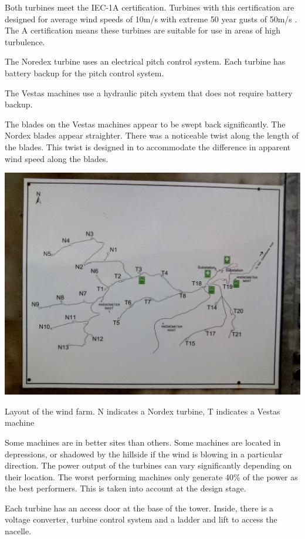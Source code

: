 \documentclass[12pt]{article} %
\begin{document}
Both turbines meet the IEC-1A certification. Turbines with this certification are designed for average wind speeds of 10m/s with extreme 50 year gusts of 50m/s \cite{burton_wind_2001}. The A certification means these turbines are suitable for use in areas of high turbulence.

The Noredex turbine uses an electrical pitch control system. Each turbine has battery backup for the pitch control system.

The Vestas machines use a hydraulic pitch system that does not require battery backup.

The blades on the Vestas machines appear to be swept back significantly. The Nordex blades appear straighter. There was a noticeable twist along the length of the blades. This twist is designed in to accommodate the difference in apparent wind speed along the blades.

\begin{center}
  \includegraphics[width=1\textwidth]{kilgarvan_layout}
\end{center}
\caption{Layout of the wind farm. N indicates a Nordex turbine, T indicates a Vestas machine}

Some machines are in better sites than others. Some machines are located in depressions, or shadowed by the hillside if the wind is blowing in a particular direction. The power output of the turbines can vary significantly depending on their location. The worst performing machines only generate 40\% of the power as the best performers. This is taken into account at the design stage.

Each turbine has an access door at the base of the tower. Inside, there is a voltage converter, turbine control system and a ladder and lift to access the nacelle.
\end{document}
